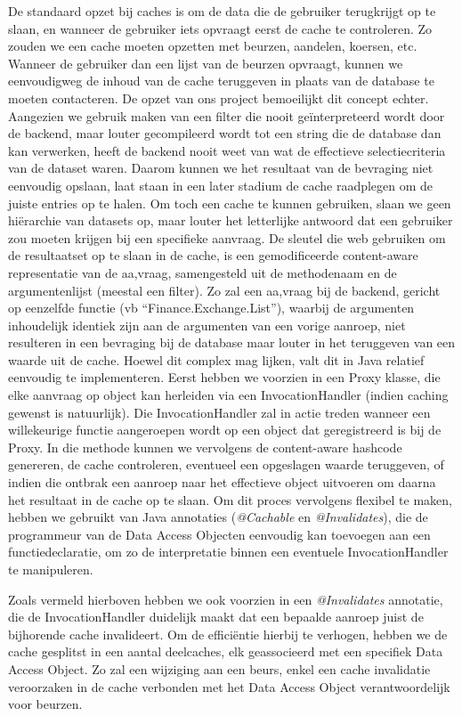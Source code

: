 De standaard opzet bij caches is om de data die de gebruiker terugkrijgt op te slaan, en wanneer de gebruiker iets opvraagt eerst de cache te controleren. Zo zouden we een cache moeten opzetten met beurzen, aandelen, koersen, etc. Wanneer de gebruiker dan een lijst van de beurzen opvraagt, kunnen we eenvoudigweg de inhoud van de cache teruggeven in plaats van de database te moeten contacteren.
De opzet van ons project bemoeilijkt dit concept echter. Aangezien we gebruik maken van een filter die nooit geïnterpreteerd wordt door de backend, maar louter gecompileerd wordt tot een string die de database dan kan verwerken, heeft de backend nooit weet van wat de effectieve selectiecriteria van de dataset waren. Daarom kunnen we het resultaat van de bevraging niet eenvoudig opslaan, laat staan in een later stadium de cache raadplegen om de juiste entries op te halen.
Om toch een cache te kunnen gebruiken, slaan we geen hiërarchie van datasets op, maar louter het letterlijke antwoord dat een gebruiker zou moeten krijgen bij een specifieke aanvraag. De sleutel die web gebruiken om de resultaatset op te slaan in de cache, is een gemodificeerde content-aware representatie van de aa,vraag, samengesteld uit de methodenaam en de argumentenlijst (meestal een filter). Zo zal een aa,vraag bij de backend, gericht op eenzelfde functie (vb ``Finance.Exchange.List''), waarbij de argumenten inhoudelijk identiek zijn aan de argumenten van een vorige aanroep, niet resulteren in een bevraging bij de database maar louter in het teruggeven van een waarde uit de cache.
Hoewel dit complex mag lijken, valt dit in Java relatief eenvoudig te implementeren. Eerst hebben we voorzien in een Proxy klasse, die elke aanvraag op object kan herleiden via een InvocationHandler (indien caching gewenst is natuurlijk). Die InvocationHandler zal in actie treden wanneer een willekeurige functie aangeroepen wordt op een object dat geregistreerd is bij de Proxy. In die methode kunnen we vervolgens de content-aware hashcode genereren, de cache controleren, eventueel een opgeslagen waarde teruggeven, of indien die ontbrak een aanroep naar het effectieve object uitvoeren om daarna het resultaat in de cache op te slaan.
Om dit proces vervolgens flexibel te maken, hebben we gebruikt van Java annotaties (\emph{@Cachable} en \emph{@Invalidates}), die de programmeur van de Data Access Objecten eenvoudig kan toevoegen aan een functiedeclaratie, om zo de interpretatie binnen een eventuele InvocationHandler te manipuleren.

Zoals vermeld hierboven hebben we ook voorzien in een \emph{@Invalidates} annotatie, die de InvocationHandler duidelijk maakt dat een bepaalde aanroep juist de bijhorende cache invalideert. Om de effici\"entie hierbij te verhogen, hebben we de cache gesplitst in een aantal deelcaches, elk geassocieerd met een specifiek Data Access Object. Zo zal een wijziging aan een beurs, enkel een cache invalidatie veroorzaken in de cache verbonden met het Data Access Object verantwoordelijk voor beurzen.

